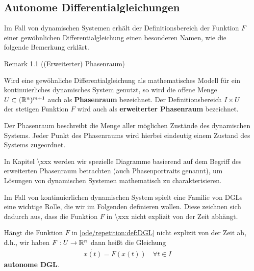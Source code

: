 \subsection{Autonome Differentialgleichungen}
\label{\detokenize{ode/repetition:autonome-differentialgleichungen}}
Im Fall von dynamischen Systemen erhält der Definitionsbereich der Funktion \(F\) einer gewöhnlichen Differentialgleichung einen besonderen Namen, wie die folgende Bemerkung erklärt.
\label{ode/repetition:remark-1}
\begin{emphBox}{}{}{Remark 1.1 ((Erweiterter) Phasenraum)}



Wird eine gewöhnliche Differentialgleichung als mathematisches Modell für ein kontinuierliches dynamisches System genutzt, so wird die offene Menge \(U\subset (\mathbb{R}^n)^{m+1}\) auch als \textbf{Phasenraum} bezeichnet.
Der Definitionsbereich \(I\times U\) der stetigen Funktion \(F\) wird auch als \textbf{erweiterter Phasenraum} bezeichnet.

Der Phasenraum beschreibt die Menge aller möglichen Zustände des dynamischen Systems.
Jeder Punkt des Phasenraums wird hierbei eindeutig einem Zustand des Systems zugeordnet.

In Kapitel \textbackslash{}xxx werden wir spezielle Diagramme basierend auf dem Begriff des erweiterten Phasenraum betrachten (auch Phasenportraits genannt), um Lösungen von dynamischen Systemen mathematisch zu charakterisieren.
\end{emphBox}

Im Fall von kontinuierlichen dynamischen System spielt eine Familie von DGLs eine wichtige Rolle, die wir im Folgenden definieren wollen.
Diese zeichnen sich dadurch aus, dass die Funktion \(F\) in \textbackslash{}xxx nicht explizit von der Zeit abhängt.
\label{ode/repetition:definition-2}
\begin{definition}{}{}



Hängt die Funktion \(F\) in \cref{ode/repetition:def:DGL} nicht explizit von der Zeit ab, d.h., wir haben \(F:U\rightarrow\mathbb{R}^n\) dann heißt die Gleichung
\begin{align}\label{equation:ode/repetition:eq:autonome_DGL}
\dot{x(t)} = F(x(t))\quad\forall t\in I
\end{align}
\textbf{autonome DGL}.
\end{definition}


